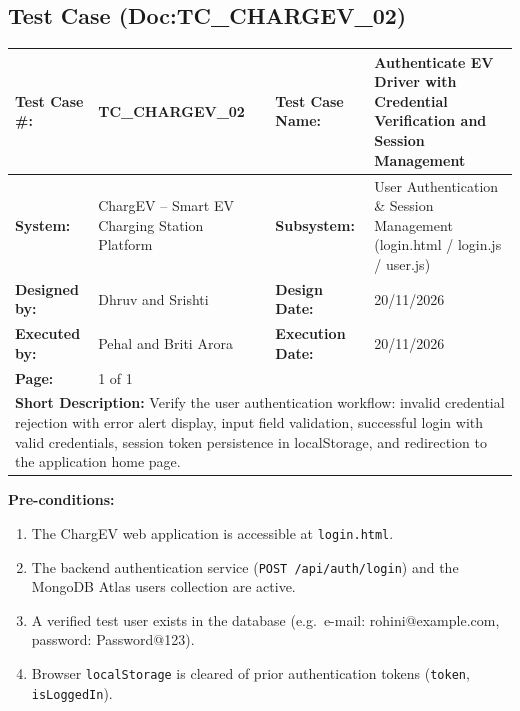 \documentclass{tietreport}
\begin{document}
\clearpage
\subsection{Test Case (Doc:TC\_CHARGEV\_02)}
\label{sec:tc02}

\begin{center}
\footnotesize
\renewcommand{\arraystretch}{1.05}
\begin{tabularx}{\textwidth}{|p{2.8cm}|X|p{2.8cm}|X|}
\hline
\textbf{Test Case \#:} & TC\_CHARGEV\_02 & \textbf{Test Case Name:} & Authenticate EV Driver with Credential Verification and Session Management \\
\hline
\textbf{System:} & ChargEV -- Smart EV Charging Station Platform & \textbf{Subsystem:} & User Authentication \& Session Management (login.html / login.js / user.js) \\
\hline
\textbf{Designed by:} & Dhruv and Srishti & \textbf{Design Date:} & 20/11/2026 \\
\hline
\textbf{Executed by:} & Pehal and Briti Arora & \textbf{Execution Date:} & 20/11/2026 \\
\hline
\textbf{Page:} & 1 of 1 & & \\
\hline
\multicolumn{4}{|p{0.96\textwidth}|}{\textbf{Short Description:} \newline Verify the user authentication workflow: invalid credential rejection with error alert display, input field validation, successful login with valid credentials, session token persistence in localStorage, and redirection to the application home page.} \\
\hline
\end{tabularx}
\end{center}

\vspace{-0.4em}
\noindent\textbf{Pre-conditions:}
\begin{enumerate}\footnotesize
    \setlength{\itemsep}{1pt}
    \setlength{\parskip}{0pt}
    \item The ChargEV web application is accessible at \texttt{login.html}.
    \item The backend authentication service (\texttt{POST /api/auth/login}) and the MongoDB Atlas users collection are active.
    \item A verified test user exists in the database (e.g.\ e-mail: rohini@example.com, password: Password@123).
    \item Browser \texttt{localStorage} is cleared of prior authentication tokens (\texttt{token}, \texttt{isLoggedIn}).
\end{enumerate}
\end{document}
